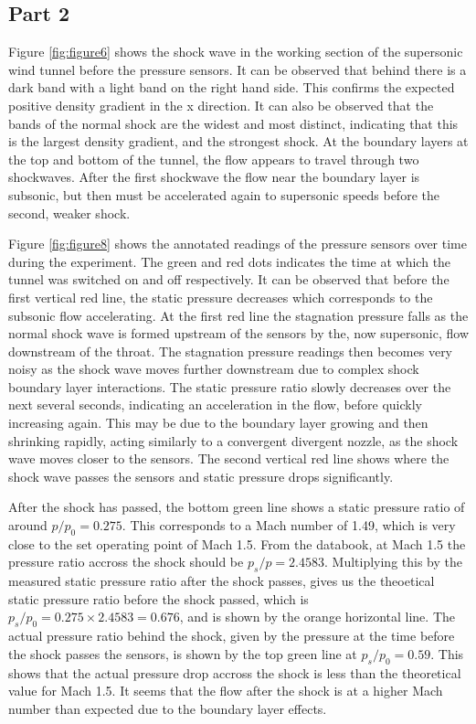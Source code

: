 \documentclass{article}
\begin{document}
\subsection{Part 2}

Figure \ref{fig:figure6} shows the shock wave in the working section of the supersonic wind tunnel before the pressure sensors.
It can be observed that behind there is a dark band with a light band on the right hand side.
This confirms the expected positive density gradient in the x direction.
It can also be observed that the bands of the normal shock are the widest and most distinct, indicating that this is the largest density gradient, and the strongest shock.
At the boundary layers at the top and bottom of the tunnel, the flow appears to travel through two shockwaves.
After the first shockwave the flow near the boundary layer is subsonic, but then must be accelerated again to supersonic speeds before the second, weaker shock.

Figure \ref{fig:figure8} shows the annotated readings of the pressure sensors over time during the experiment.
The green and red dots indicates the time at which the tunnel was switched on and off respectively.
It can be observed that before the first vertical red line, the static pressure decreases which corresponds to the subsonic flow accelerating.
At the first red line the stagnation pressure falls as the normal shock wave is formed upstream of the sensors by the, now supersonic, flow downstream of the throat.
The stagnation pressure readings then becomes very noisy as the shock wave moves further downstream due to complex shock boundary layer interactions.
The static pressure ratio slowly decreases over the next several seconds, indicating an acceleration in the flow, before quickly increasing again.
This may be due to the boundary layer growing and then shrinking rapidly, acting similarly to a convergent divergent nozzle, as the shock wave moves closer to the sensors.
The second vertical red line shows where the shock wave passes the sensors and static pressure drops significantly.

After the shock has passed, the bottom green line shows a static pressure ratio of around $p/p_0 = 0.275$. This corresponds to a Mach number of 1.49, which is very close to the set operating point of Mach 1.5.
From the databook, at Mach 1.5 the pressure ratio accross the shock should be $p_s/p = 2.4583$.
Multiplying this by the measured static pressure ratio after the shock passes, gives us the theoetical static pressure ratio before the shock passed, which is $p_s/p_0 = 0.275 \times 2.4583 = 0.676$, and is shown by the orange horizontal line.
The actual pressure ratio behind the shock, given by the pressure at the time before the shock passes the sensors, is shown by the top green line at $p_s/p_0 = 0.59$.
This shows that the actual pressure drop accross the shock is less than the theoretical value for Mach 1.5.
It seems that the flow after the shock is at a higher Mach number than expected due to the boundary layer effects.
\end{document}
